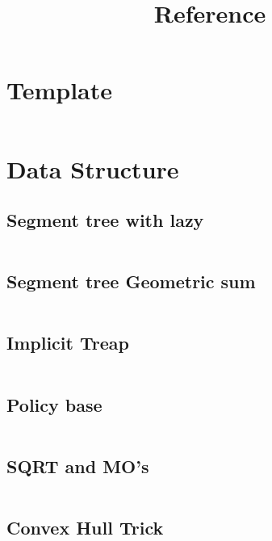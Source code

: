 \documentclass[10pt]{article}
\title{Reference}
\begin{document}
			\section{Template}
			\inputminted[tabsize=2,breaklines,fontsize=\small, style=bw]{c++}{template.cpp}
			\section{Data Structure}
				\subsection{Segment tree with lazy}
					\inputminted[tabsize=2,breaklines,fontsize=\small, style=bw]{c++}{DataStructures/SegmentTree.cpp}
				\subsection{Segment tree Geometric sum}	
					\inputminted[tabsize=2,breaklines,fontsize=\small, style=bw]{c++}{DataStructures/ST-geometricSum.cpp}
				\subsection{Implicit Treap}
					\inputminted[tabsize=2,breaklines,fontsize=\small, style=bw]{c++}{DataStructures/implicitTreap.cpp}
				\subsection{Policy base }	
					\inputminted[tabsize=2,breaklines,fontsize=\small, style=bw]{c++}{DataStructures/policyBase.cpp}
				\subsection{SQRT and MO's}
					\inputminted[tabsize=2,breaklines,fontsize=\small, style=bw]{c++}{DataStructures/sqrtDecom.cpp}
				\subsection{Convex Hull Trick}
					\inputminted[tabsize=2,breaklines,fontsize=\small, style=bw]{c++}{DataStructures/ConvexHullTrick.cpp}
\end{document}
